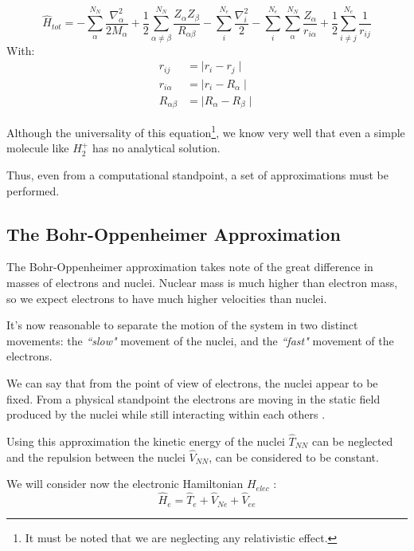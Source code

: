 \documentclass[a4paper,12pt]{article}
\begin{document}
\begin{equation}\label{eq:theHamiltonian}
\boxed{
	\hat{H}_{tot}   = - \sum_{\alpha}^{N_N} \frac{\nabla^2_{\alpha}}{2M_{\alpha}}
					+ \frac{1}{2}\sum_{\alpha \neq \beta}^{N_N} \frac{Z_{\alpha} Z_{\beta}} {R_{\alpha \beta}}
					- \sum_{i}^{N_e} \frac{\nabla_{i}^2}{2}
					- \sum_{i}^{N_e} \sum_{\alpha}^{N_N} \frac{ Z_{\alpha} }{r_{i \alpha}}				
					+ \frac{1}{2} \sum_{i \neq j}^{N_e} \frac{1}{r_{ij}}
}
\end{equation}
With:
\begin{align*}
	r_{ij} & = \mid r_{i} - r_{j} \mid 
\\
	r_{i \alpha} & = \mid r_{i} - R_{\alpha} \mid 
\\
	R_{\alpha \beta} & = \mid R_{\alpha} - R_{\beta} \mid 
\end{align*}

Although the universality of this equation\footnote{It must be noted that we are neglecting any relativistic effect.}, we know very well that even a simple molecule like $H_2^{+}$ has no analytical solution.

Thus, even from a computational standpoint, a set of approximations must be performed.


\subsection{The Bohr-Oppenheimer Approximation}

The Bohr-Oppenheimer approximation takes note of the great difference in masses of electrons and nuclei.
Nuclear mass is much higher than electron mass, so we expect electrons to have much higher velocities than	 nuclei. 

It's now reasonable to separate the motion of the system in two distinct movements: the \textit{``slow"} movement of the nuclei, and the \textit{``fast"} movement of the electrons.

We can say that from the point of view of electrons, the nuclei appear to be fixed. 
From a physical standpoint the electrons are moving in the static field produced by the nuclei while still interacting within each others \cite[p.241]{Atkins97}.


Using this approximation the kinetic energy of the nuclei $\hat{T}_{NN}$ can be neglected and the repulsion between the nuclei $\hat{V}_{NN}$, can be considered to be constant.

We will consider now the electronic Hamiltonian $H_{elec}$ :
\begin{equation}
	\hat{H}_{e} = \hat{T}_{e} + \hat{V}_{Ne} + \hat{V}_{ee}
\end{equation}
\end{document}
